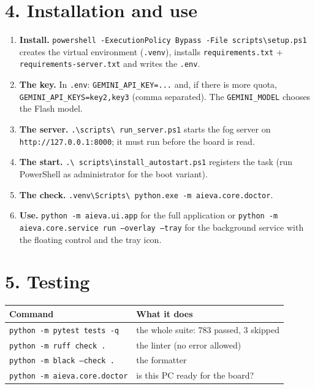 \documentclass[10pt,a4paper]{article}
\begin{document}
\section*{4. Installation and use}

\begin{enumerate}
\item \textbf{Install.} \texttt{powershell -ExecutionPolicy Bypass -File
      scripts\textbackslash setup.ps1} creates the virtual environment
      (\texttt{.venv}), installs \texttt{requirements.txt} +
      \texttt{requirements-server.txt} and writes the \texttt{.env}.
\item \textbf{The key.} In \texttt{.env}:
      \texttt{GEMINI\_API\_KEY=...} and, if there is more quota,
      \texttt{GEMINI\_API\_KEYS=key2,key3} (comma separated). The
      \texttt{GEMINI\_MODEL} chooses the Flash model.
\item \textbf{The server.} \texttt{.\textbackslash scripts\textbackslash
      run\_server.ps1} starts the fog server on
      \texttt{http://127.0.0.1:8000}; it must run before the board is read.
\item \textbf{The start.} \texttt{.\textbackslash
      scripts\textbackslash install\_autostart.ps1} registers the task (run
      PowerShell as administrator for the boot variant).
\item \textbf{The check.} \texttt{.venv\textbackslash Scripts\textbackslash
      python.exe -m aieva.core.doctor}.
\item \textbf{Use.} \texttt{python -m aieva.ui.app} for the full application
      or \texttt{python -m aieva.core.service run --overlay --tray} for the
      background service with the floating control and the tray icon.
\end{enumerate}

\section*{5. Testing}

\begin{center}
\begin{tabular}{@{}ll@{}}
\toprule
\textbf{Command} & \textbf{What it does} \\
\midrule
\texttt{python -m pytest tests -q} & the whole suite: 783 passed, 3 skipped \\
\texttt{python -m ruff check .} & the linter (no error allowed) \\
\texttt{python -m black --check .} & the formatter \\
\texttt{python -m aieva.core.doctor} & is this PC ready for the board? \\
\bottomrule
\end{tabular}
\end{center}
\end{document}
